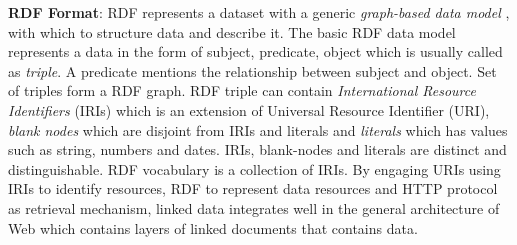 \noindent \textbf{RDF Format}: RDF represents a dataset with a generic \textit{graph-based data model} \cite{linkeddatasofar}, with which to structure data and describe it. The basic RDF data model represents a data in the form of subject, predicate, object which is usually called as \textit{triple}. A predicate mentions the relationship between subject and object. Set of triples form a RDF graph. RDF triple can contain\textit{ International Resource Identifiers} (IRIs) which is an extension of Universal Resource Identifier (URI), \textit{blank nodes} which are disjoint from IRIs and literals  and \textit{literals} which has values such as string, numbers and dates. IRIs, blank-nodes and literals are distinct and distinguishable.  RDF vocabulary is a collection of IRIs. By engaging URIs using IRIs to identify resources, RDF to represent data resources and HTTP protocol as retrieval mechanism, linked data integrates well in the general architecture of Web which contains layers of linked documents that contains data. 

